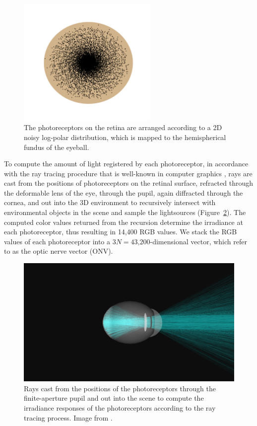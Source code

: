 \documentclass [MS] {UCLAthesis}
\begin{document}
\begin{figure}
    \centering
    \includegraphics[width=0.6\textwidth,height=0.605\textwidth]{retina_log_polar}
    \caption[Photoreceptor distribution on the retina]{The photoreceptors on the retina are arranged according to a 2D noisy log-polar distribution, which is mapped to the hemispherical fundus of the eyeball.}
    \label{fig:task_log_polar_retina}
\end{figure}

To compute the amount of light registered by each photoreceptor, in accordance with the ray tracing procedure that is well-known in computer graphics \citep{ray_tracing}, rays are cast from the positions of photoreceptors on the retinal surface, refracted through the deformable lens of the eye, through the pupil, again diffracted through the cornea, and out into the 3D environment to recursively intersect with environmental objects in the scene and sample the lightsources (Figure~\ref{fig:raytracing}). The computed color values returned from the recursion determine the irradiance at each photoreceptor, thus resulting in 14,400 RGB values. We stack the RGB values of each photoreceptor into a $3N=\text{43,200}$-dimensional vector, which \citet{Masaki} refer to as the optic nerve vector (ONV).

\begin{figure}
\centering
\includegraphics[width=0.44\linewidth,height=0.40\linewidth,trim={300mm 30mm 0 30mm},clip]{tracemodeloverlaybiggercornea}
\caption[Ray tracing in the eye model]{Rays
cast from the positions of the photoreceptors through the
finite-aperture pupil and out into the scene to compute the irradiance
responses of the photoreceptors according to the ray tracing process. Image from \citep{Arjun}.}
\label{fig:raytracing}
\end{figure}
\end{document}
